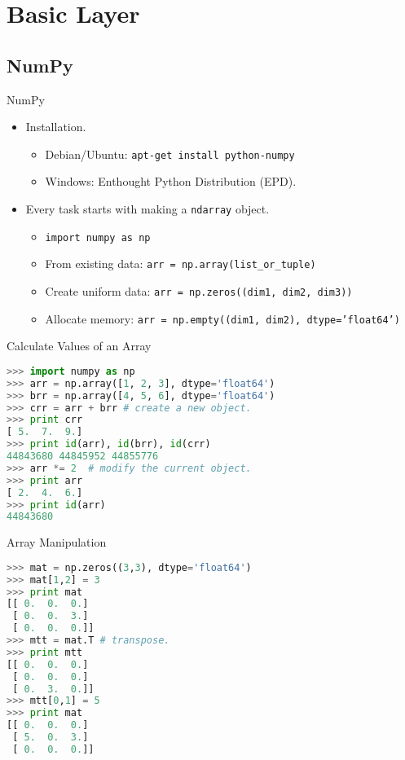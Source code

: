 \documentclass[dvips,xcolor=pst]{beamer}
\begin{document}
\section{
Basic Layer
}

\subsection{
NumPy
}

\begin{frame}{
%
NumPy
%
}
\begin{itemize} \large
  \item Installation.
  \begin{itemize} \large
    \item Debian/Ubuntu: \texttt{apt-get install python-numpy}
    \item Windows: Enthought Python Distribution (EPD).
  \end{itemize}
  \item Every task starts with making a \texttt{ndarray} object.
  \begin{itemize} \large
    \item \texttt{import numpy as np}
    \item From existing data: \texttt{arr = np.array(list\_or\_tuple)}
    \item Create uniform data: \texttt{arr = np.zeros((dim1, dim2, dim3))}
    \item Allocate memory: \texttt{arr = np.empty((dim1, dim2), dtype='float64')}
  \end{itemize}
\end{itemize}
\end{frame}

\begin{frame}[fragile]{
%
Calculate Values of an Array
%
}
\begin{lstlisting}[language=Python]
>>> import numpy as np
>>> arr = np.array([1, 2, 3], dtype='float64')
>>> brr = np.array([4, 5, 6], dtype='float64')
>>> crr = arr + brr # create a new object.
>>> print crr
[ 5.  7.  9.]
>>> print id(arr), id(brr), id(crr)
44843680 44845952 44855776
>>> arr *= 2  # modify the current object.
>>> print arr
[ 2.  4.  6.]
>>> print id(arr)
44843680
\end{lstlisting}
\end{frame}

\begin{frame}[fragile]{
%
Array Manipulation
%
}
\small
\begin{lstlisting}[language=Python]
>>> mat = np.zeros((3,3), dtype='float64')
>>> mat[1,2] = 3
>>> print mat
[[ 0.  0.  0.]
 [ 0.  0.  3.]
 [ 0.  0.  0.]]
>>> mtt = mat.T # transpose.
>>> print mtt
[[ 0.  0.  0.]
 [ 0.  0.  0.]
 [ 0.  3.  0.]]
>>> mtt[0,1] = 5
>>> print mat
[[ 0.  0.  0.]
 [ 5.  0.  3.]
 [ 0.  0.  0.]]
\end{lstlisting}
\end{frame}
\end{document}
